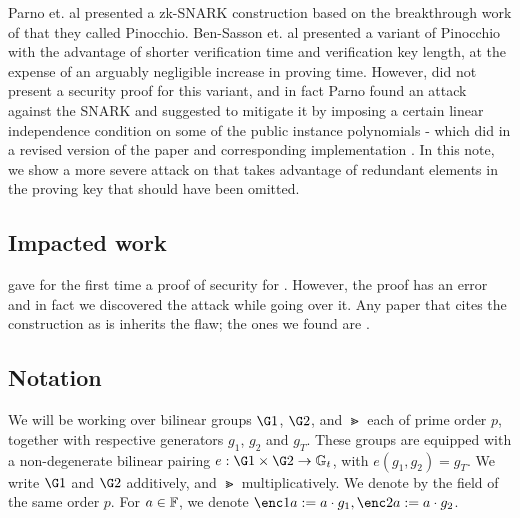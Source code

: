 \documentclass[11pt]{article}
\numberwithin{equation}{section} %
\numberwithin{figure}{section} %
\begin{document}
Parno et. al \cite{PGHR} presented a zk-SNARK construction based on the breakthrough work of \cite{GGPR} that they called Pinocchio.
Ben-Sasson et. al \cite{BCTV} presented a variant of Pinocchio with the advantage of shorter verification time and verification key length, at the expense of an arguably negligible increase in proving time. However, \cite{BCTV} did not present a security proof for this variant, and in fact Parno \cite{Parno15} found an attack against the \cite{BCTV} SNARK and suggested to mitigate it by imposing a certain linear independence condition on some of the public instance polynomials - which \cite{BCTV} did in a revised version of the paper and corresponding implementation \cite{libsnark}. In this note, we show a more severe attack on \cite{BCTV} that takes advantage of redundant elements in the proving key that should have been omitted.


\subsection{Impacted work}
\cite{BGG} gave for the first time a proof of security for \cite{BCTV}. However, the proof has an error and in fact we discovered the attack while going over it.
Any paper that cites the \cite{BCTV} construction as is inherits the flaw; the ones we found are \cite{Adsnark,Fuchsbauer18}.
% 



\subsection{Notation}
We will be working over bilinear groups $\G1$, $\G2$, and $\Gt$ each of prime order $p$, together with respective generators $g_1$, $g_2$ and $g_T$.
These groups are equipped with a non-degenerate bilinear pairing $e:\G1 \times \G2 \to \Gt$, with $e(g_1, g_2) = g_T$.
We write $\G1$ and $\G2$ additively, and $\Gt$ multiplicatively.
We denote by \F the field of the same order $p$.
For $a \in \mathbb F$, we denote $\enc1{a}\defeq a\cdot g_1, \enc2{a}\defeq a\cdot g_2$.
\end{document}
